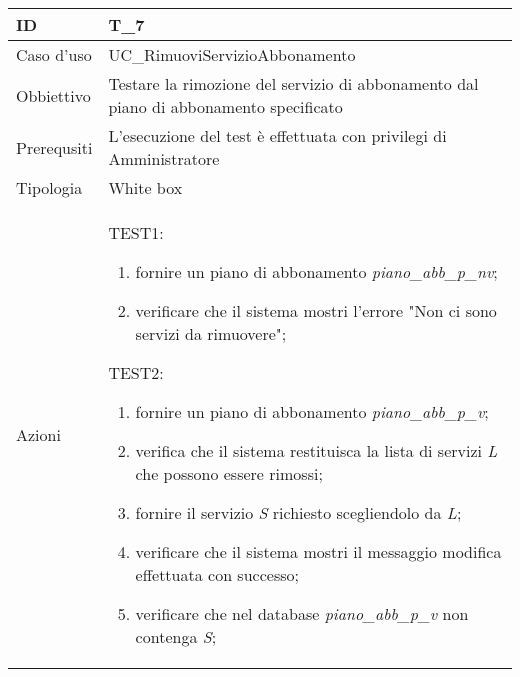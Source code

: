 \begin{table}[hb]
    \centering
    \begin{tabular}{ |p{2cm}|p{10cm}|  }
        \hline
        ID          & T\_7                                                                                  \\\hline
        Caso d'uso  & UC\_RimuoviServizioAbbonamento                                                        \\\hline
        Obbiettivo  & Testare la rimozione del servizio di abbonamento dal piano di abbonamento specificato \\\hline
        Prerequsiti & L'esecuzione del test è effettuata con privilegi di Amministratore                    \\\hline
        Tipologia   & White box                                                                             \\\hline
        Azioni      &
        TEST1:
        \begin{enumerate}[nosep, topsep=0pt]
            \item fornire un piano di abbonamento \emph{piano\_abb\_p\_nv};
            \item verificare che il sistema mostri l'errore "Non ci sono servizi da rimuovere";
        \end{enumerate}
        \vspace{0.5cm} TEST2:
        \begin{enumerate}[nosep, topsep=0pt]
            \item fornire un piano di abbonamento \emph{piano\_abb\_p\_v};
            \item verifica che il sistema restituisca la lista di servizi \emph{L} che possono essere rimossi;
            \item fornire il servizio \emph{S} richiesto scegliendolo da \emph{L};
            \item verificare che il sistema mostri il messaggio modifica effettuata con successo;
            \item verificare che nel database \emph{piano\_abb\_p\_v} non contenga \emph{S};
        \end{enumerate}
        \\\hline
    \end{tabular}
\end{table}

